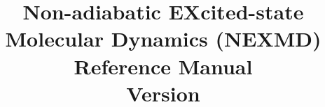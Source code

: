 \documentclass[letterpaper,12pt,titlepage]{article}
\title{Non-adiabatic EXcited-state Molecular Dynamics (NEXMD) Reference Manual\\ Version \versionnumber}
\date{}
\begin{document}
\maketitle
\tableofcontents

\newpage


\newpage


\newpage


\newpage


\newpage


\newpage


\newpage


\newpage


\begin{appendix}
    \newpage
    

    \newpage
    
\end{appendix}

\newpage


\end{document}
